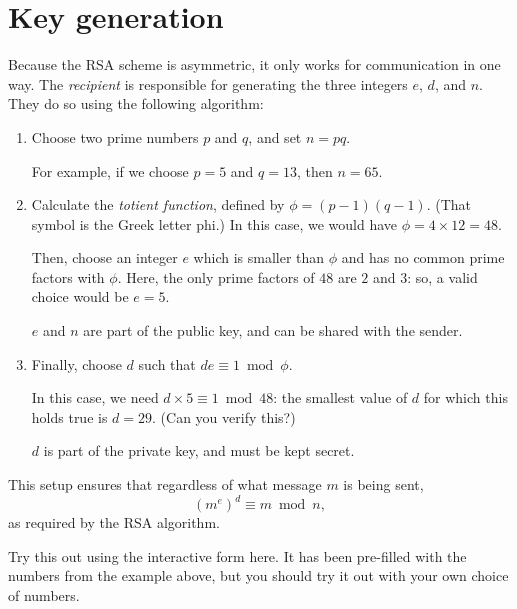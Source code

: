 \documentclass[
  letterpaper,
  DIV=11,
  numbers=noendperiod]{scrreprt}
\begin{document}
\hypertarget{key-generation}{%
\section{Key generation}\label{key-generation}}

Because the RSA scheme is asymmetric, it only works for communication in
one way. The \emph{recipient} is responsible for generating the three
integers \(e\), \(d\), and \(n\). They do so using the following
algorithm:

\begin{enumerate}
\def\labelenumi{\arabic{enumi}.}
\item
  Choose two prime numbers \(p\) and \(q\), and set \(n = pq\).

  For example, if we choose \(p = 5\) and \(q = 13\), then \(n = 65\).
\item
  Calculate the \emph{totient function}, defined by
  \(\phi = (p - 1)(q - 1)\). (That symbol is the Greek letter phi.) In
  this case, we would have \(\phi = 4 \times 12 = 48\).

  Then, choose an integer \(e\) which is smaller than \(\phi\) and has
  no common prime factors with \(\phi\). Here, the only prime factors of
  \(48\) are \(2\) and \(3\): so, a valid choice would be \(e = 5\).

  \(e\) and \(n\) are part of the public key, and can be shared with the
  sender.
\item
  Finally, choose \(d\) such that \(de \equiv 1 \bmod\phi\).

  In this case, we need \(d \times 5 \equiv 1 \bmod 48\): the smallest
  value of \(d\) for which this holds true is \(d = 29\). (Can you
  verify this?)

  \(d\) is part of the private key, and must be kept secret.
\end{enumerate}

This setup ensures that regardless of what message \(m\) is being sent,
\[(m^e)^d \equiv m \bmod n,\] as required by the RSA algorithm.

Try this out using the interactive form here. It has been pre-filled
with the numbers from the example above, but you should try it out with
your own choice of numbers.
\end{document}
